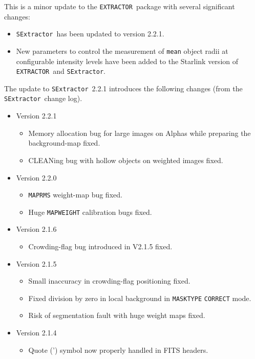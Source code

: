 \documentclass[twoside,11pt]{article}
\renewcommand{\_}{\texttt{\symbol{95}}}
\newcommand{\EXTRACTOR}{\texttt{EXTRACTOR}}
\newcommand{\SExtractor}{\texttt{SExtractor}}
\begin{document}
 This is a minor update to the \EXTRACTOR\ package with several
 significant changes:
 \begin{itemize}
   \item \SExtractor\ has been updated to version 2.2.1.

   \item New parameters to control the measurement of \texttt{mean}
         object radii at configurable intensity levels have been
         added to the Starlink version of \EXTRACTOR\ and \SExtractor.
 \end{itemize}
 The update to \SExtractor\ 2.2.1 introduces the following changes (from
 the \SExtractor\ change log).
 \begin{itemize}
   \item Version 2.2.1
      \begin{itemize}
         \item  Memory allocation bug for large images on Alphas while
                preparing the background-map fixed.
         \item CLEANing bug with hollow objects on weighted images fixed.
      \end{itemize}
   \item Version 2.2.0
      \begin{itemize}
        \item \texttt{MAP\_RMS} weight-map bug fixed.
        \item Huge \texttt{MAP\_WEIGHT} calibration bugs fixed.
      \end{itemize}
   \item Version 2.1.6
     \begin{itemize}
        \item Crowding-flag bug introduced in V2.1.5 fixed.
     \end{itemize}
   \item Version 2.1.5
      \begin{itemize}
        \item Small inaccuracy in crowding-flag positioning fixed.
        \item Fixed division by zero in local background in
              \texttt{MASK\_TYPE} \texttt{CORRECT} mode.
        \item Risk of segmentation fault with huge weight maps fixed.
      \end{itemize}
   \item Version 2.1.4
      \begin{itemize}
        \item Quote (') symbol now properly handled in FITS headers.

\end{itemize}
\end{itemize}
\end{document}
